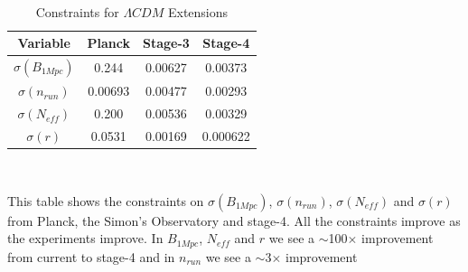 {{\begin{table}[h]
\centering
\caption{Constraints for $\Lambda CDM$ Extensions}
\\
\label{table: sigmas}
\begin{tabular}{l|l|l|l}
\multicolumn{1}{c}{Variable} & \multicolumn{1}{|c}{Planck} & \multicolumn{1}{|c}{Stage-3} & \multicolumn{1}{|c}{Stage-4} \\ \hline
\multicolumn{1}{c}{$\sigma(B_{1Mpc})$} & \multicolumn{1}{|c}{0.244} & \multicolumn{1}{|c}{0.00627} & \multicolumn{1}{|c}{0.00373} \\
\multicolumn{1}{c}{$\sigma(n_{run})$} & \multicolumn{1}{|c}{0.00693} & \multicolumn{1}{|c}{0.00477} & \multicolumn{1}{|c}{0.00293} \\
\multicolumn{1}{c}{$\sigma(N_{eff})$} & \multicolumn{1}{|c}{0.200} & \multicolumn{1}{|c}{0.00536} & \multicolumn{1}{|c}{0.00329} \\
\multicolumn{1}{c}{$\sigma(r)$} & \multicolumn{1}{|c}{0.0531} & \multicolumn{1}{|c}{0.00169} & \multicolumn{1}{|c}{0.000622} \\
\end{tabular}
\\
\begin{flushleft}
This table shows the constraints on $\sigma(B_{1Mpc})$, $\sigma(n_{run})$, $\sigma(N_{eff})$ and $\sigma(r)$ from Planck, the Simon's Observatory and stage-4. All the constraints improve as the experiments improve. In $B_{1Mpc}$, $N_{eff}$ and $r$ we see a $\sim$100$\times$ improvement from current to stage-4 and in $n_{run}$ we see a $\sim$3$\times$ improvement
\end{flushleft}
\end{table}

}}
